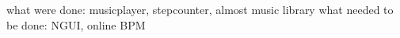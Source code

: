 what were done: musicplayer, stepcounter, almost music library 
what needed to be done: NGUI, online BPM
